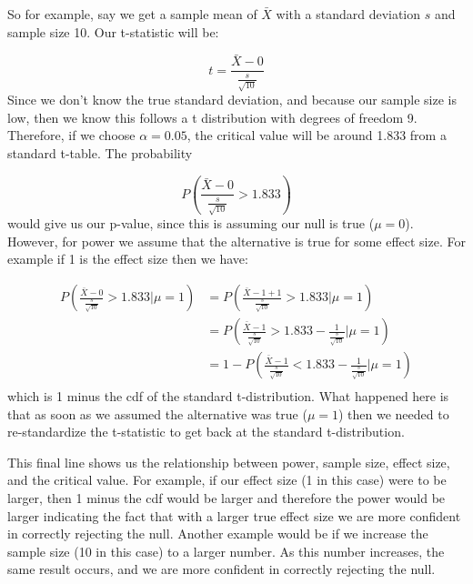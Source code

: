 So for example, say we get a sample mean of $\bar{X}$ with a standard deviation $s$ and sample size 10. Our t-statistic will be:

\begin{equation}
t = \frac{\bar{X} - 0}{\frac{s}{\sqrt{10}}}
\end{equation}
\noindent Since we don't know the true standard deviation, and because our sample size is low, then we know this follows a t distribution with degrees of freedom 9. Therefore, if we choose $\alpha=0.05$, the critical value will be around 1.833 from a standard t-table. The probability 

\begin{equation}
P \left( \frac{\bar{X} - 0}{\frac{s}{\sqrt{10}}}> 1.833 \right) 
\end{equation}
\noindent would give us our p-value, since this is assuming our null is true ($\mu=0$). However, for power we assume that the alternative is true for some effect size. For example if 1 is the effect size then we have:

\begin{equation}
\begin{split}
P \left( \frac{\bar{X} - 0}{\frac{s}{\sqrt{10}}} > 1.833 | \mu = 1 \right)  & = P \left(\frac{\bar{X} - 1+1}{\frac{s}{\sqrt{10}}} > 1.833 | \mu = 1 \right) \\
&= P \left( \frac{\bar{X} - 1}{\frac{s}{\sqrt{10}}} > 1.833 - \frac{1}{\frac{s}{\sqrt{10}}}  | \mu = 1 \right) \\
&= 1 - P \left( \frac{\bar{X} - 1}{\frac{s}{\sqrt{10}}}< 1.833 - \frac{1}{\frac{s}{\sqrt{10}}}  | \mu = 1 \right) \\
\end{split}
\end{equation}
\noindent which is 1 minus the cdf of the standard t-distribution. What happened here is that as soon as we assumed the alternative was true ($\mu=1$) then we needed to re-standardize the t-statistic to get back at the standard t-distribution.

This final line shows us the relationship between power, sample size, effect size, and the critical value. For example, if our effect size (1 in this case) were to be larger, then 1 minus the cdf would be larger and therefore the power would be larger indicating the fact that with a larger true effect size we are more confident in correctly rejecting the null. Another example would be if we increase the sample size (10 in this case) to a larger number. As this number increases, the same result occurs, and we are more confident in correctly rejecting the null. 

